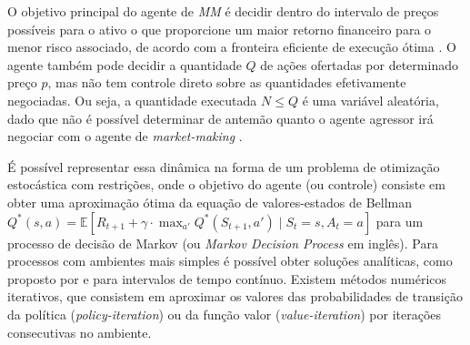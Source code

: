 O objetivo principal do agente de \textit{MM} é decidir dentro do intervalo de preços possíveis para o ativo o que proporcione um maior retorno financeiro para o menor risco associado, de acordo com a fronteira eficiente de execução ótima \citep{almgren2000}. O agente também pode decidir a quantidade $Q$ de ações ofertadas por determinado preço $p$, mas não tem controle direto sobre as quantidades efetivamente negociadas. Ou seja, a quantidade executada $N \leq Q$ é uma variável aleatória, dado que não é possível determinar de antemão quanto o agente agressor irá negociar com o agente de \textit{market-making} \citep{rao2020stochastic}.

É possível representar essa dinâmica na forma de um problema de otimização estocástica com restrições, onde o objetivo do agente (ou controle) consiste em obter uma aproximação ótima da equação de valores-estados de Bellman $Q^{*}(s, a) = \mathbb{E} \left[ R_{t+1} + \gamma \cdot \max_{a'} Q^{*}(S_{t+1}, a') \mid S_t = s, A_t = a \right]$ para um processo de decisão de Markov (ou \textit{Markov Decision Process} em inglês). Para processos com ambientes mais simples é possível obter soluções analíticas, como proposto por \citep{Avellaneda2008} e \citep{rao2020stochastic} para intervalos de tempo contínuo. Existem métodos numéricos iterativos, que consistem em aproximar os valores das probabilidades de transição da política (\textit{policy-iteration}) ou da função valor (\textit{value-iteration}) por iterações consecutivas no ambiente.

